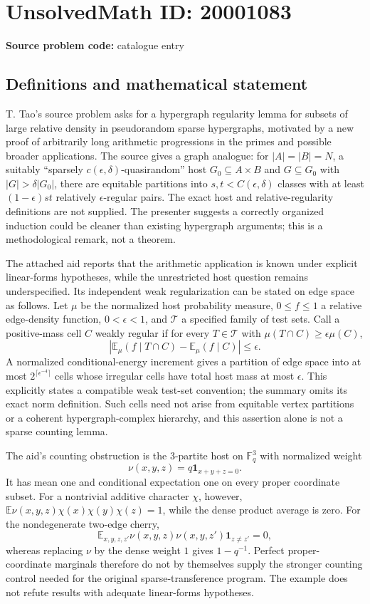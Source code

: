 \documentclass[11pt]{article}
\newcommand{\F}{\mathbb{F}}
\newcommand{\E}{\mathbb{E}}
\begin{document}
\section*{UnsolvedMath ID: 20001083}
\textbf{Source problem code:} catalogue entry
\subsection{Definitions and mathematical statement}
T. Tao's source problem asks for a hypergraph regularity lemma for subsets of large relative density in pseudorandom sparse hypergraphs, motivated by a new proof of arbitrarily long arithmetic progressions in the primes and possible broader applications. The source gives a graph analogue: for $|A|=|B|=N$, a suitably ``sparsely $c(\epsilon,\delta)$-quasirandom'' host $G_0\subseteq A\times B$ and $G\subseteq G_0$ with $|G|>\delta|G_0|$, there are equitable partitions into $s,t<C(\epsilon,\delta)$ classes with at least $(1-\epsilon)st$ relatively $\epsilon$-regular pairs. The exact host and relative-regularity definitions are not supplied. The presenter suggests a correctly organized induction could be cleaner than existing hypergraph arguments; this is a methodological remark, not a theorem.

The attached aid reports that the arithmetic application is known under explicit linear-forms hypotheses, while the unrestricted host question remains underspecified. Its independent weak regularization can be stated on edge space as follows. Let $\mu$ be the normalized host probability measure, $0\le f\le1$ a relative edge-density function, $0<\epsilon<1$, and $\mathcal T$ a specified family of test sets. Call a positive-mass cell $C$ weakly regular if for every $T\in\mathcal T$ with $\mu(T\cap C)\ge\epsilon\mu(C)$,
\[
\left|\E_\mu(f\mid T\cap C)-\E_\mu(f\mid C)\right|\le\epsilon.
\]
A normalized conditional-energy increment gives a partition of edge space into at most $2^{\lceil\epsilon^{-4}\rceil}$ cells whose irregular cells have total host mass at most $\epsilon$. This explicitly states a compatible weak test-set convention; the summary omits its exact norm definition. Such cells need not arise from equitable vertex partitions or a coherent hypergraph-complex hierarchy, and this assertion alone is not a sparse counting lemma.

The aid's counting obstruction is the $3$-partite host on $\F_q^3$ with normalized weight
\[
\nu(x,y,z)=q\mathbf1_{x+y+z=0}.
\]
It has mean one and conditional expectation one on every proper coordinate subset. For a nontrivial additive character $\chi$, however, $\E\nu(x,y,z)\chi(x)\chi(y)\chi(z)=1$, while the dense product average is zero. For the nondegenerate two-edge cherry,
\[
\E_{x,y,z,z'}\nu(x,y,z)\nu(x,y,z')\mathbf1_{z\ne z'}=0,
\]
whereas replacing $\nu$ by the dense weight $1$ gives $1-q^{-1}$. Perfect proper-coordinate marginals therefore do not by themselves supply the stronger counting control needed for the original sparse-transference program. The example does not refute results with adequate linear-forms hypotheses.
\end{document}
